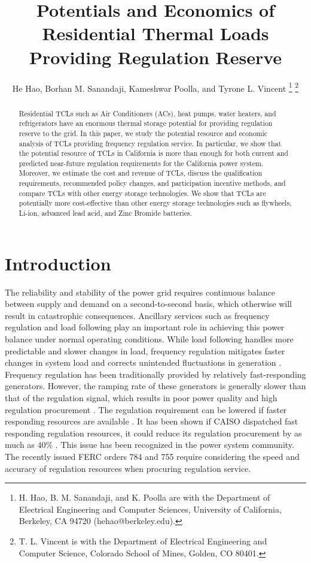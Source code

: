 \documentclass[onecolumn,journal]{IEEEtran}
\title{Potentials and Economics of Residential Thermal Loads Providing Regulation Reserve}
\author{
He Hao, Borhan M. Sanandaji, Kameshwar Poolla, and Tyrone L. Vincent 
\thanks{H. Hao, B. M. Sanandaji, and K. Poolla are with the Department of Electrical Engineering and Computer Sciences, University of California, Berkeley, CA 94720 (hehao@berkeley.edu).}
\thanks{T. L. Vincent is with the Department of Electrical Engineering and Computer Science, Colorado School of Mines, Golden, CO 80401.}
}
\begin{document}
\maketitle

\begin{abstract}
Residential \acp{TCL} such as Air Conditioners (ACs), heat pumps, water heaters, and refrigerators have an enormous thermal storage potential for providing regulation reserve to the grid. In this paper, we study the potential resource and economic analysis of TCLs providing frequency regulation service. In particular, we show that the potential resource of \acp{TCL} in California is more than enough for both current and predicted near-future regulation requirements for the California power system. Moreover, we estimate the cost and revenue of \acp{TCL}, discuss the qualification requirements, recommended policy changes, and participation incentive methods, and compare \acp{TCL} with other energy storage technologies. We show that \acp{TCL} are potentially more cost-effective than other energy storage technologies such as flywheels, Li-ion, advanced lead acid, and Zinc Bromide batteries.  
\end{abstract}


\acresetall
\section{Introduction}\label{sec:intro}

The reliability and stability of the power grid requires continuous balance between supply and demand on a second-to-second basis, which otherwise will result in catastrophic consequences. Ancillary services such as frequency regulation and load following play an important role in achieving this power balance under normal operating conditions. While load following handles more predictable and slower changes in load, frequency regulation mitigates faster changes in system load and corrects unintended fluctuations in generation \cite{AS_Kirby}.  Frequency regulation has been traditionally provided by relatively fast-responding generators. However, the ramping rate of these generators is generally slower than that of the regulation signal, which results in poor power quality and high regulation procurement \cite{AS_Kirby, ERCOT}. The regulation requirement can be lowered if faster responding resources are available \cite{kema2009fastresponse}. It has been shown if \ac{CAISO} dispatched fast responding regulation resources, it could reduce its regulation procurement by as much as $40\%$ \cite{pnnl2008value}. This issue has been recognized in the power system community. The recently issued FERC orders 784 and 755 require considering the speed and accuracy of regulation resources when procuring regulation service.
\end{document}
